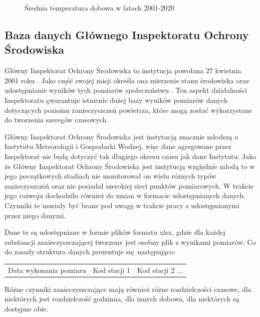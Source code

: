 \documentclass[10pt,a4paper]{article}
\begin{document}
\begin{figure}[!ht]
	\centering
	\caption{Średnia temperatura dobowa w latach 2001-2020}
	\label{figure:imgw}
\end{figure}
\FloatBarrier

\subsection{Baza danych Głównego Inspektoratu Ochrony Środowiska}
Główny Inspektorat Ochrony Środowiska to instytucja powołana 27 kwietnia 2001 roku \cite{giosStart}. Jako część swojej misji określa ona mierzenie stanu środowiska oraz udostępnianie wyników tych pomiarów społeczeństwu \cite{giosMission}. Ten aspekt działalności Inspektoratu gwarantuje istnienie dużej bazy wyników pomiarów danych dotyczących poziomu zanieczyszczeń powietrza, które mogą zostać wykorzystane do tworzenia szeregów czasowych. 

Główny Inspektorat Ochrony Środowiska jest instytucją znacznie młodszą o Instytutu Meteorologii i Gospodarki Wodnej, więc dane agregowane przez Inspektorat nie będą dotyczyć tak długiego okresu czasu jak dane Instytutu. Jako że Główny Inspektorat Ochrony Środowiska jest instytucją względnie młodą to w jego początkowych stadiach nie monitorował on wielu różnych typów zanieczyszczeń oraz nie posiadał szerokiej sieci punktów pomiarowych. W trakcie jego rozwoju dochodziło również do zmian w formacie udostępnianych danych. Czynniki te musiały być brane pod uwagę w trakcie pracy z udostępnianymi przez niego danymi. 

Dane te są udostępniane w formie plików formatu xlsx, gdzie dla każdej substancji zanieczyszczającej tworzony jest osobny plik z wynikami pomiarów. Co do zasady struktura danych prezentuje się następująco:
\begin{center}
	\begin{tabular}{|c|c|c}
		Data wykonania pomiaru & Kod stacji 1 & Kod stacji 2 ...
	\end{tabular}
\end{center}
Różne czynniki zanieczyszczające mają również różne rozdzielczości czasowe, dla niektórych jest rozdzielczość godzinna, dla innych dobowa, dla niektórych są dostępne obie. 
\end{document}
